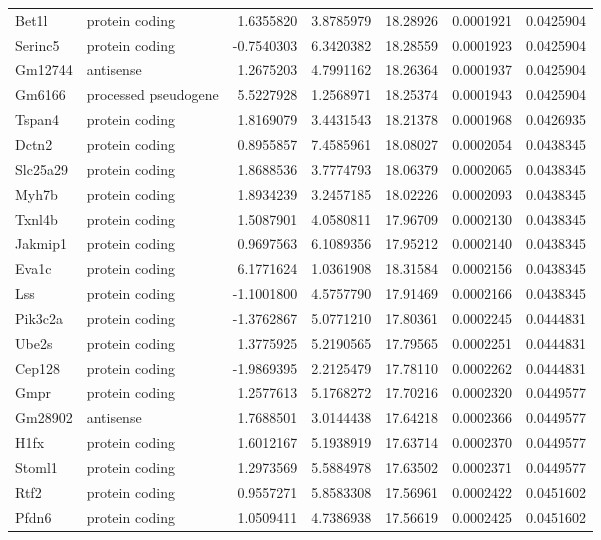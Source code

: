 \documentclass[onehalf,12pt]{beavtex}
\begin{document}
\begin{longtable}{llrrrrr}
  Bet1l & protein coding & 1.6355820 & 3.8785979 & 18.28926 & 0.0001921 & 0.0425904\\
  Serinc5 & protein coding & -0.7540303 & 6.3420382 & 18.28559 & 0.0001923 & 0.0425904\\
  Gm12744 & antisense & 1.2675203 & 4.7991162 & 18.26364 & 0.0001937 & 0.0425904\\
  \addlinespace
  Gm6166 & processed pseudogene & 5.5227928 & 1.2568971 & 18.25374 & 0.0001943 & 0.0425904\\
  Tspan4 & protein coding & 1.8169079 & 3.4431543 & 18.21378 & 0.0001968 & 0.0426935\\
  Dctn2 & protein coding & 0.8955857 & 7.4585961 & 18.08027 & 0.0002054 & 0.0438345\\
  Slc25a29 & protein coding & 1.8688536 & 3.7774793 & 18.06379 & 0.0002065 & 0.0438345\\
  Myh7b & protein coding & 1.8934239 & 3.2457185 & 18.02226 & 0.0002093 & 0.0438345\\
  \addlinespace
  Txnl4b & protein coding & 1.5087901 & 4.0580811 & 17.96709 & 0.0002130 & 0.0438345\\
  Jakmip1 & protein coding & 0.9697563 & 6.1089356 & 17.95212 & 0.0002140 & 0.0438345\\
  Eva1c & protein coding & 6.1771624 & 1.0361908 & 18.31584 & 0.0002156 & 0.0438345\\
  Lss & protein coding & -1.1001800 & 4.5757790 & 17.91469 & 0.0002166 & 0.0438345\\
  Pik3c2a & protein coding & -1.3762867 & 5.0771210 & 17.80361 & 0.0002245 & 0.0444831\\
  \addlinespace
  Ube2s & protein coding & 1.3775925 & 5.2190565 & 17.79565 & 0.0002251 & 0.0444831\\
  Cep128 & protein coding & -1.9869395 & 2.2125479 & 17.78110 & 0.0002262 & 0.0444831\\
  Gmpr & protein coding & 1.2577613 & 5.1768272 & 17.70216 & 0.0002320 & 0.0449577\\
  Gm28902 & antisense & 1.7688501 & 3.0144438 & 17.64218 & 0.0002366 & 0.0449577\\
  H1fx & protein coding & 1.6012167 & 5.1938919 & 17.63714 & 0.0002370 & 0.0449577\\
  \addlinespace
  Stoml1 & protein coding & 1.2973569 & 5.5884978 & 17.63502 & 0.0002371 & 0.0449577\\
  Rtf2 & protein coding & 0.9557271 & 5.8583308 & 17.56961 & 0.0002422 & 0.0451602\\
  Pfdn6 & protein coding & 1.0509411 & 4.7386938 & 17.56619 & 0.0002425 & 0.0451602\\

\end{longtable}
\end{document}
